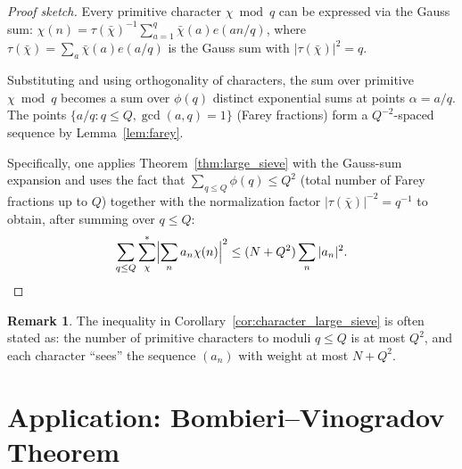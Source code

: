 \documentclass[12pt,a4paper]{amsart}
\theoremstyle{definition}
\newtheorem{remark}[theorem]{Remark}
\newcommand{\eexp}[1]{e\!\left(#1\right)}
\begin{document}
\begin{proof}[Proof sketch]
  Every primitive character $\chi\bmod q$ can be expressed via the
  Gauss sum: $\chi(n) = \tau(\bar\chi)^{-1}\sum_{a=1}^{q}\bar\chi(a)
  \eexp{an/q}$, where $\tau(\bar\chi) = \sum_a \bar\chi(a)\eexp{a/q}$
  is the Gauss sum with $|\tau(\bar\chi)|^2 = q$.

  Substituting and using orthogonality of characters, the sum over
  primitive $\chi\bmod q$ becomes a sum over $\phi(q)$ distinct
  exponential sums at points $\alpha = a/q$.  The points $\{a/q : q \leq Q,
  \gcd(a,q) = 1\}$ (Farey fractions) form a $Q^{-2}$-spaced sequence by
  Lemma~\ref{lem:farey}.

  Specifically, one applies Theorem~\ref{thm:large_sieve} with the Gauss-sum
  expansion and uses the fact that $\sum_{q \leq Q}\phi(q) \leq Q^2$ (total
  number of Farey fractions up to $Q$) together with the normalization factor
  $|\tau(\bar\chi)|^{-2} = q^{-1}$ to obtain, after summing over $q \leq Q$:
  \[
    \sum_{q \leq Q}\sum_{\chi}^*\Bigl|\sum_n a_n\chi(n)\Bigr|^2
    \leq (N + Q^2)\sum_n|a_n|^2. \qedhere
  \]
\end{proof}

\begin{remark}
  The inequality in Corollary~\ref{cor:character_large_sieve} is often
  stated as: the number of primitive characters to moduli $q \leq Q$ is
  at most $Q^2$, and each character ``sees'' the sequence $(a_n)$ with
  weight at most $N + Q^2$.
\end{remark}

\section{Application: Bombieri--Vinogradov Theorem}
\end{document}
